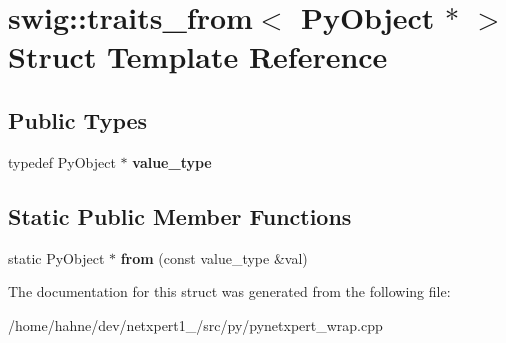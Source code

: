 \hypertarget{structswig_1_1traits__from_3_01PyObject_01_5_01_4}{}\section{swig\+:\+:traits\+\_\+from$<$ Py\+Object $\ast$ $>$ Struct Template Reference}
\label{structswig_1_1traits__from_3_01PyObject_01_5_01_4}
\subsection*{Public Types}
\begin{DoxyCompactItemize}
\item 
typedef Py\+Object $\ast$ {\bfseries value\+\_\+type}\hypertarget{structswig_1_1traits__from_3_01PyObject_01_5_01_4_a3f736b20ca687eb0894c64d1b8ec2b11}{}\label{structswig_1_1traits__from_3_01PyObject_01_5_01_4_a3f736b20ca687eb0894c64d1b8ec2b11}

\end{DoxyCompactItemize}
\subsection*{Static Public Member Functions}
\begin{DoxyCompactItemize}
\item 
static Py\+Object $\ast$ {\bfseries from} (const value\+\_\+type \&val)\hypertarget{structswig_1_1traits__from_3_01PyObject_01_5_01_4_ab383a520e9f35b0d778819da07efd42d}{}\label{structswig_1_1traits__from_3_01PyObject_01_5_01_4_ab383a520e9f35b0d778819da07efd42d}

\end{DoxyCompactItemize}


The documentation for this struct was generated from the following file\+:\begin{DoxyCompactItemize}
\item 
/home/hahne/dev/netxpert1\+\_/src/py/pynetxpert\+\_\+wrap.\+cpp\end{DoxyCompactItemize}
